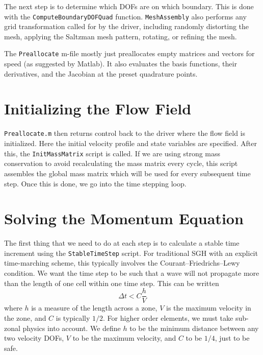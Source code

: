 
The next step is to determine which DOFs are on which boundary. This is done with the \texttt{ComputeBoundaryDOFQuad} function. \texttt{MeshAssembly} also performs any grid transformation called for by the driver, including randomly distorting the mesh, applying the Saltzman mesh pattern, rotating, or refining the mesh.

The \texttt{Preallocate} m-file mostly just preallocates empty matrices and vectors for speed (as suggested by Matlab). It also evaluates the basis functions, their derivatives, and the Jacobian at the preset quadrature points.

\section{Initializing the Flow Field}
\texttt{Preallocate.m} then returns control back to the driver where the flow field is initialized. Here the initial velocity profile and state variables are specified. After this, the \texttt{InitMassMatrix} script is called. If we are using strong mass conservation to avoid recalculating the mass matrix every cycle, this script assembles the global mass matrix which will be used for every subsequent time step. Once this is done, we go into the time stepping loop.

\section{Solving the Momentum Equation}
The first thing that we need to do at each step is to calculate a stable time increment using the \texttt{StableTimeStep} script. For traditional SGH with an explicit time-marching scheme, this typically involves the Courant–Friedrichs–Lewy \cite{CourantFriedrichsLewy28} condition. We want the time step to be such that a wave will not propagate more than the length of one cell within one time step. This can be written
\[
 \Delta t < C \frac{h}{V}
\]
where $h$ is a measure of the length across a zone, $V$ is the maximum velocity in the zone, and $C$ is typically $1/2$. For higher order elements, we must take sub-zonal physics into account. We define $h$ to be the minimum distance between any two velocity DOFs, $V$ to be the maximum velocity, and $C$ to be $1/4$, just to be safe. 

